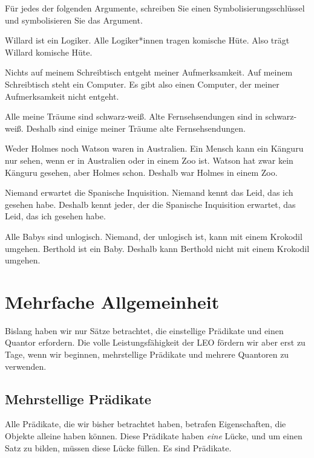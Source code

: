 \problempart
\label{pr.FOLarguments}
Für jedes der folgenden Argumente, schreiben Sie einen Symbolisierungsschlüssel und symbolisieren Sie das Argument.
\begin{earg}
\item Willard ist ein Logiker. Alle Logiker*innen tragen komische Hüte. Also trägt Willard komische Hüte.
\item Nichts auf meinem Schreibtisch entgeht meiner Aufmerksamkeit. Auf meinem Schreibtisch steht ein Computer. Es gibt also einen Computer, der meiner Aufmerksamkeit nicht entgeht.
\item Alle meine Träume sind schwarz-wei{\ss}. Alte Fernsehsendungen sind in schwarz-wei{\ss}. Deshalb sind einige meiner Träume alte Fernsehsendungen.
\item Weder Holmes noch Watson waren in Australien. Ein Mensch kann ein Känguru nur sehen, wenn er in Australien oder in einem Zoo ist. Watson hat zwar kein Känguru gesehen, aber Holmes schon. Deshalb war Holmes in einem Zoo.
\item Niemand erwartet die Spanische Inquisition. Niemand kennt das Leid, das ich gesehen habe. Deshalb kennt jeder, der die Spanische Inquisition erwartet, das Leid, das ich gesehen habe.
\item Alle Babys sind unlogisch. Niemand, der unlogisch ist, kann mit einem Krokodil umgehen. Berthold ist ein Baby. Deshalb kann Berthold nicht mit einem Krokodil umgehen.
\end{earg}


\chapter{Mehrfache Allgemeinheit}\label{s:MultipleGenerality}
Bislang haben wir nur Sätze betrachtet, die einstellige Prädikate und einen Quantor erfordern. Die volle Leistungsfähigkeit der LEO fördern wir aber erst zu Tage, wenn wir beginnen, mehrstellige Prädikate und mehrere Quantoren zu verwenden. 

\section{Mehrstellige Prädikate}
Alle Prädikate, die wir bisher betrachtet haben, betrafen Eigenschaften, die Objekte alleine haben können. Diese Prädikate haben \emph{eine} Lücke, und um einen Satz zu bilden, müssen diese Lücke füllen. Es sind  Prädikate.

